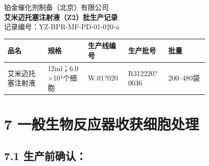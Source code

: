 \documentclass[UTF8,10pt,a4paper,fontset=fandol]{ctexart}
\newcommand{\fieldvalue}[1]{#1}
\newcommand{\handwritten}[1]{#1}
\begin{document}

\newpage

\begin{center}
铂金催化剂制备（北京）有限公司\\
\textbf{艾米迈托塞注射液（Z2）批生产记录}\\
记录编号：YZ-BPR-MF-PD-01-020-a
\end{center}

\begin{tabular}{|p{0.20\linewidth}|p{0.20\linewidth}|p{0.20\linewidth}|p{0.20\linewidth}|}
\hline
品名 & 规格 & 生产线编号 & 生产批号 & 批量\\
\hline
\fieldvalue{艾米迈托塞注射液}
&
\fieldvalue{12ml；6.0$\times$10$^{4}$个细胞}
&
\fieldvalue{\handwritten{W.01?020}}
&
\fieldvalue{\handwritten{R312220?0036}}
&
\fieldvalue{200--480袋}\\
\hline
\end{tabular}

\section*{7  一般生物反应器收获细胞处理}

\subsection*{7.1 生产前确认：}
\end{document}
